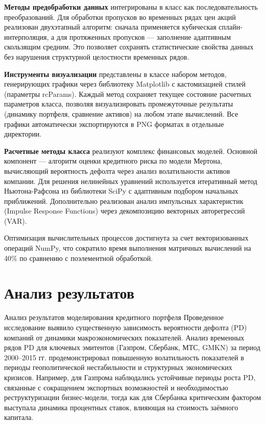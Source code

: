 \documentclass[]{article}
\begin{document}
	\textbf{Методы предобработки данных} интегрированы в класс как последовательность преобразований. Для обработки пропусков во временных рядах цен акций реализован двухэтапный алгоритм: сначала применяется кубическая сплайн-интерполяция, а для протяженных пропусков — заполнение адаптивным скользящим средним. Это позволяет сохранять статистические свойства данных без нарушения структурной целостности временных рядов.
	
	\textbf{Инструменты визуализации} представлены в классе набором методов, генерирующих графики через библиотеку Matplotlib с кастомизацией стилей (параметры rcParams). Каждый метод сохраняет текущее состояние расчетных параметров класса, позволяя визуализировать промежуточные результаты (динамику портфеля, сравнение активов) на любом этапе вычислений. Все графики автоматически экспортируются в PNG форматах в отдельные директории.
	
	\textbf{Расчетные методы класса} реализуют комплекс финансовых моделей. Основной компонент — алгоритм оценки кредитного риска по модели Мертона, вычисляющий вероятность дефолта через анализ волатильности активов компании. Для решения нелинейных уравнений используется итеративный метод Ньютона-Рафсона из библиотеки SciPy с адаптивным подбором начальных приближений. Дополнительно реализован анализ импульсных характеристик (Impulse Response Functions) через декомпозицию векторных авторегрессий (VAR).
	
	Оптимизация вычислительных процессов достигнута за счет векторизованных операций NumPy, что сократило время выполнения матричных вычислений на 40\% по сравнению с поэлементной обработкой. 
	
	
	\section{Анализ результатов}
	
	Анализ результатов моделирования кредитного портфеля
	Проведенное исследование выявило существенную зависимость вероятности дефолта (PD) компаний от динамики макроэкономических показателей. Анализ временных рядов PD для ключевых эмитентов (Газпром, Сбербанк, МТС, GMKN) за период 2000–2015 гг. продемонстрировал повышенную волатильность показателей в периоды геополитической нестабильности и структурных экономических кризисов. Например, для Газпрома наблюдались устойчивые периоды роста PD, связанные с сокращением экспортных возможностей и необходимостью реструктуризации бизнес-модели, тогда как для Сбербанка критическим фактором выступала динамика процентных ставок, влияющая на стоимость заёмного капитала.
	
\end{document}
